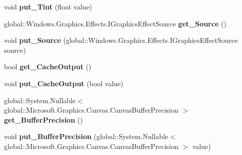 \begin{DoxyCompactItemize}
void {\bfseries put\+\_\+\+Tint} (float value)
\item 
\mbox{\label{class_microsoft_1_1_graphics_1_1_canvas_1_1_effects_1_1_temperature_and_tint_effect_abbabd3d602c1135a09f9a6cb9f205e51}} 
global\+::\+Windows.\+Graphics.\+Effects.\+I\+Graphics\+Effect\+Source {\bfseries get\+\_\+\+Source} ()
\item 
\mbox{\label{class_microsoft_1_1_graphics_1_1_canvas_1_1_effects_1_1_temperature_and_tint_effect_a72294e2088f294cc1c29ae174184bafd}} 
void {\bfseries put\+\_\+\+Source} (global\+::\+Windows.\+Graphics.\+Effects.\+I\+Graphics\+Effect\+Source source)
\item 
\mbox{\label{class_microsoft_1_1_graphics_1_1_canvas_1_1_effects_1_1_temperature_and_tint_effect_a6506ba2d54d6a3609d276734e4406681}} 
bool {\bfseries get\+\_\+\+Cache\+Output} ()
\item 
\mbox{\label{class_microsoft_1_1_graphics_1_1_canvas_1_1_effects_1_1_temperature_and_tint_effect_ae78822024f1a6438879f484dc15e9632}} 
void {\bfseries put\+\_\+\+Cache\+Output} (bool value)
\item 
\mbox{\label{class_microsoft_1_1_graphics_1_1_canvas_1_1_effects_1_1_temperature_and_tint_effect_a8d0faf7638707a9f20470868d69fa811}} 
global\+::\+System.\+Nullable$<$ global\+::\+Microsoft.\+Graphics.\+Canvas.\+Canvas\+Buffer\+Precision $>$ {\bfseries get\+\_\+\+Buffer\+Precision} ()
\item 
\mbox{\label{class_microsoft_1_1_graphics_1_1_canvas_1_1_effects_1_1_temperature_and_tint_effect_a290251f935370171fd225a875c898652}} 
void {\bfseries put\+\_\+\+Buffer\+Precision} (global\+::\+System.\+Nullable$<$ global\+::\+Microsoft.\+Graphics.\+Canvas.\+Canvas\+Buffer\+Precision $>$ value)
\item 
\mbox{\label{class_microsoft_1_1_graphics_1_1_canvas_1_1_effects_1_1_temperature_and_tint_effect_a56f9911d2470ca65d769e85f3b515921}} 

\end{DoxyCompactItemize}
